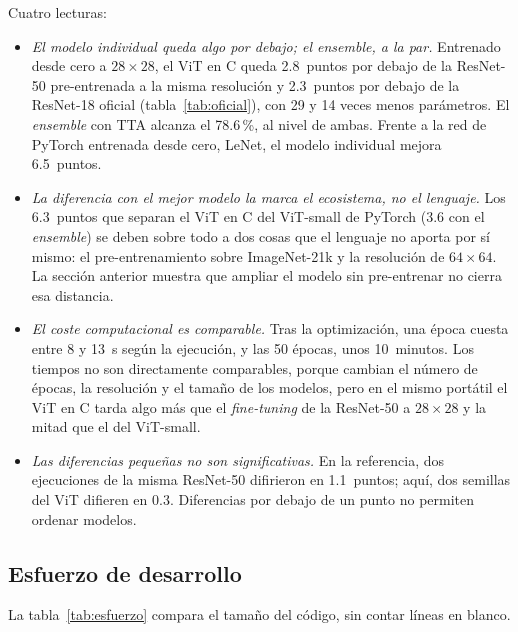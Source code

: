 \documentclass[11pt,a4paper]{article}
\begin{document}
Cuatro lecturas:

\begin{itemize}
  \item \emph{El modelo individual queda algo por debajo; el ensemble, a la
        par.} Entrenado desde cero a $28\times28$, el ViT en C queda 2.8~puntos
        por debajo de la ResNet-50 pre-entrenada a la misma resolución y
        2.3~puntos por debajo de la ResNet-18 oficial (tabla~\ref{tab:oficial}),
        con 29 y 14 veces menos parámetros. El \emph{ensemble} con TTA alcanza
        el 78.6\,\%, al nivel de ambas. Frente a la red de PyTorch entrenada
        desde cero, LeNet, el modelo individual mejora 6.5~puntos.
  \item \emph{La diferencia con el mejor modelo la marca el ecosistema, no el
        lenguaje.} Los 6.3~puntos que separan el ViT en C del ViT-small de
        PyTorch (3.6 con el \emph{ensemble}) se deben sobre todo a dos cosas que
        el lenguaje no aporta por sí mismo: el pre-entrenamiento sobre
        ImageNet-21k y la resolución de $64\times64$.
        La sección anterior muestra que ampliar el modelo sin pre-entrenar no
        cierra esa distancia.
  \item \emph{El coste computacional es comparable.} Tras la optimización, una
        época cuesta entre 8 y 13~s según la ejecución, y las 50 épocas, unos
        10~minutos. Los tiempos no son directamente comparables, porque cambian
        el número de épocas, la resolución y el tamaño de los modelos, pero en
        el mismo portátil el ViT en C tarda algo más que el \emph{fine-tuning}
        de la ResNet-50 a $28\times28$ y la mitad que el del ViT-small.
  \item \emph{Las diferencias pequeñas no son significativas.} En la referencia,
        dos ejecuciones de la misma ResNet-50 difirieron en 1.1~puntos; aquí,
        dos semillas del ViT difieren en 0.3. Diferencias por debajo de un punto
        no permiten ordenar modelos.
\end{itemize}

\subsection{Esfuerzo de desarrollo}

La tabla~\ref{tab:esfuerzo} compara el tamaño del código, sin contar líneas en
blanco.
\end{document}
